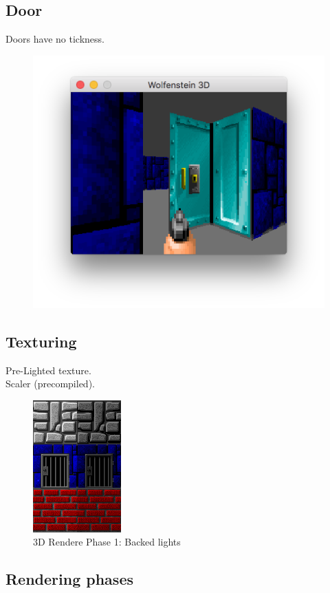 \documentclass[book.tex]{subfiles}
\begin{document}
\subsection{Door}
Doors have no tickness.\\
\begin{figure}[H]
 \centering
 \includegraphics[scale=1.3]{imgs/door_flat.png}
\end{figure}
\subsection{Texturing}


Pre-Lighted texture.\\
Scaler (precompiled).\\
  \begin{figure}[H]
\centering
 \includegraphics[scale=3.3]{imgs/baked_lights.png}
 \caption{3D Rendere Phase 1: Backed lights} \label{fig:backee_lights}
 \end{figure}

\subsection{Rendering phases}
\end{document}
